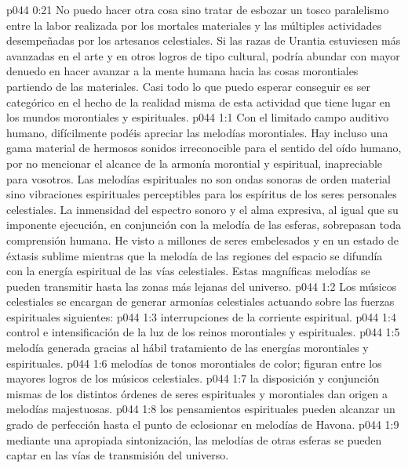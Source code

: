 \vs p044 0:21 \pc No puedo hacer otra cosa sino tratar de esbozar un tosco paralelismo entre la labor realizada por los mortales materiales y las múltiples actividades desempeñadas por los artesanos celestiales. Si las razas de Urantia estuviesen más avanzadas en el arte y en otros logros de tipo cultural, podría abundar con mayor denuedo en hacer avanzar a la mente humana hacia las cosas morontiales partiendo de las materiales. Casi todo lo que puedo esperar conseguir es ser categórico en el hecho de la realidad misma de esta actividad que tiene lugar en los mundos morontiales y espirituales.
\vs p044 1:1 Con el limitado campo auditivo humano, difícilmente podéis apreciar las melodías morontiales. Hay incluso una gama material de hermosos sonidos irreconocible para el sentido del oído humano, por no mencionar el alcance de la armonía morontial y espiritual, inapreciable para vosotros. Las melodías espirituales no son ondas sonoras de orden material sino vibraciones espirituales perceptibles para los espíritus de los seres personales celestiales. La inmensidad del espectro sonoro y el alma expresiva, al igual que su imponente ejecución, en conjunción con la melodía de las esferas, sobrepasan toda comprensión humana. He visto a millones de seres embelesados y en un estado de éxtasis sublime mientras que la melodía de las regiones del espacio se difundía con la energía espiritual de las vías celestiales. Estas magníficas melodías se pueden transmitir hasta las zonas más lejanas del universo.
\vs p044 1:2 Los músicos celestiales se encargan de generar armonías celestiales actuando sobre las fuerzas espirituales siguientes:
\vs p044 1:3  interrupciones de la corriente espiritual.
\vs p044 1:4  control e intensificación de la luz de los reinos morontiales y espirituales.
\vs p044 1:5  melodía generada gracias al hábil tratamiento de las energías morontiales y espirituales.
\vs p044 1:6  melodías de tonos morontiales de color; figuran entre los mayores logros de los músicos celestiales.
\vs p044 1:7  la disposición y conjunción mismas de los distintos órdenes de seres espirituales y morontiales dan origen a melodías majestuosas.
\vs p044 1:8  los pensamientos espirituales pueden alcanzar un grado de perfección hasta el punto de eclosionar en melodías de Havona.
\vs p044 1:9  mediante una apropiada sintonización, las melodías de otras esferas se pueden captar en las vías de transmisión del universo.
